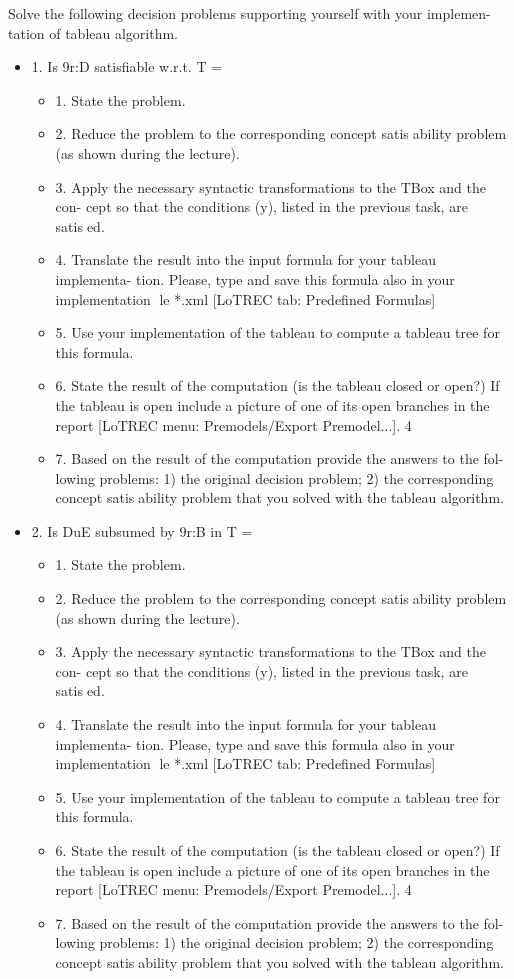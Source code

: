 \documentclass[11pt]{article} %
\begin{document}
Solve the following decision problems supporting yourself with your implemen-
tation of tableau algorithm.
\begin{itemize}

\item 1. Is 9r:D satisfiable w.r.t. T =
\begin{itemize}

\item 1. State the problem.
\item 2. Reduce the problem to the corresponding concept satisability problem
(as shown during the lecture).
\item 3. Apply the necessary syntactic transformations to the TBox and the con-
cept so that the conditions (y), listed in the previous task, are satised.
\item 4. Translate the result into the input formula for your tableau implementa-
tion. Please, type and save this formula also in your implementation le
*.xml [LoTREC tab: Predefined Formulas]
\item 5. Use your implementation of the tableau to compute a tableau tree for this
formula.
\item 6. State the result of the computation (is the tableau closed or open?) If the
tableau is open include a picture of one of its open branches in the report
[LoTREC menu: Premodels/Export Premodel...].
4
\item 7. Based on the result of the computation provide the answers to the fol-
lowing problems: 1) the original decision problem; 2) the corresponding
concept satisability problem that you solved with the tableau algorithm.

\end{itemize}

\item 2. Is DuE subsumed by 9r:B in T =
\begin{itemize}

\item 1. State the problem.
\item 2. Reduce the problem to the corresponding concept satisability problem
(as shown during the lecture).
\item 3. Apply the necessary syntactic transformations to the TBox and the con-
cept so that the conditions (y), listed in the previous task, are satised.
\item 4. Translate the result into the input formula for your tableau implementa-
tion. Please, type and save this formula also in your implementation le
*.xml [LoTREC tab: Predefined Formulas]
\item 5. Use your implementation of the tableau to compute a tableau tree for this
formula.
\item 6. State the result of the computation (is the tableau closed or open?) If the
tableau is open include a picture of one of its open branches in the report
[LoTREC menu: Premodels/Export Premodel...].
4
\item 7. Based on the result of the computation provide the answers to the fol-
lowing problems: 1) the original decision problem; 2) the corresponding
concept satisability problem that you solved with the tableau algorithm.


\end{itemize}
\end{itemize}
\end{document}

